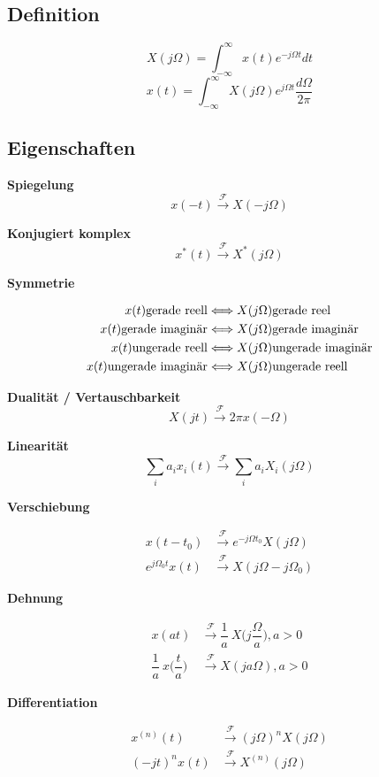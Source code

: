 \documentclass[10pt,a4paper]{article}
\newcommand{\fancyformula}[2]{
	\small
	\raggedright\sffamily\textbf{#1}
	#2
}
\newcommand{\ftransform}{
	\xrightarrow{~\mathcal{F}~}
}
\begin{document}
\subsection*{Definition}
\begin{multicols}{2}
	\[ X(j\Omega)=\int_{-\infty}^{\infty}x(t)e^{-j\Omega t}dt \]
	\[ x(t)=\int_{-\infty}^{\infty}X(j\Omega)e^{j\Omega t} \dfrac{d\Omega}{2\pi} \]
\end{multicols}
\subsection*{Eigenschaften}
\begin{multicols}{2}
	
\fancyformula{Spiegelung}{\[ x(-t)\ftransform X(-j\Omega) \]}
\fancyformula{Konjugiert komplex}{\[ x^*(t) \ftransform X^*(j\Omega)\]}
\fancyformula{Symmetrie}{
\begin{align*}
	x(t) \textnormal{gerade reell} &\Longleftrightarrow X(j\Omega) \textnormal{gerade reel} \\
	x(t) \textnormal{gerade imaginär} &\Longleftrightarrow X(j\Omega) \textnormal{gerade imaginär} \\
	x(t) \textnormal{ungerade reell} &\Longleftrightarrow X(j\Omega) \textnormal{ungerade imaginär} \\
	x(t) \textnormal{ungerade imaginär} &\Longleftrightarrow X(j\Omega) \textnormal{ungerade reell} \\
\end{align*}
}
\fancyformula{Dualität / Vertauschbarkeit}{\[ X(jt)\ftransform 2\pi x(-\Omega) \]}
\fancyformula{Linearität}{\[ \sum_{i} a_i x_i(t) \ftransform \sum_{i} a_i X_i(j\Omega)\]}
\fancyformula{Verschiebung}{
\begin{align*}
	x(t-t_0) &\ftransform e^{-j\Omega t_0}X(j\Omega) \\
	e^{j\Omega_0t}x(t) &\ftransform X(j\Omega-j\Omega_0)
\end{align*}
}
\fancyformula{Dehnung}{
\begin{align*}
	x(at) &\ftransform \dfrac{1}{a}~X\bigg(j\dfrac{\Omega}{a}\bigg), a>0 \\
	\dfrac{1}{a}~x\bigg(\dfrac{t}{a}\bigg) &\ftransform X(ja\Omega), a>0
\end{align*}
}
\fancyformula{Differentiation}{
\begin{align*}
	x^{(n)}(t) &\ftransform (j\Omega)^nX(j\Omega) \\
	(-jt)^nx(t) &\ftransform X^{(n)}(j\Omega)
\end{align*}	
}
\end{multicols}
\end{document}
